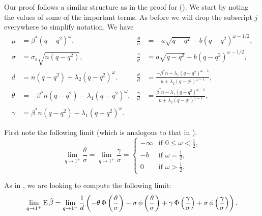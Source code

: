 Our proof follows a similar structure as in the proof for 
(). We start by noting the values of some of the
important terms. As before we will drop the subscript \(j\) everywhere to simplify
notation. We have
\begin{align*}
  \mu    & = \beta^*(q -q^2)^\omega,                     & \frac{\theta}{\sigma} & = -a\sqrt{q-q^2} - b(q-q^2)^{\omega - 1/2},                                           \\
  \sigma & = \sigma_\varepsilon \sqrt{n(q-q^2)},         & \frac{\gamma}{\sigma} & = a\sqrt{q-q^2} - b(q-q^2)^{\omega - 1/2},                                            \\
  d      & = n(q-q^2) + \lambda_2(q-q^2)^\omega.\,       & \frac{\theta}{d}      & = \frac{-\beta^*n - \lambda_1(q-q^2)^{\omega - 1}}{n + \lambda_2(q-q^2)^{\omega -1}}, \\
  \theta & = -\beta^*n(q-q^2) - \lambda_1(q-q^2)^\omega, & \frac{\gamma}{d}      & = \frac{\beta^*n - \lambda_1(q-q^2)^{\omega - 1}}{n + \lambda_2(q-q^2)^{\omega -1}},  \\
  \gamma & = \beta^*n(q-q^2) - \lambda_1(q-q^2)^\omega.
\end{align*}

First note the following limit (which is analogous to that in ).
\begin{equation}
  \label{eq:eval-sigma-limits-weighted}
  \lim_{q \rightarrow 1^+} \frac{\theta}{\sigma} = \lim_{q \rightarrow 1^+} \frac{\gamma}{\sigma} =
  \begin{cases}
    -\infty & \text{if } 0 \leq \omega < \frac{1}{2}, \\
    -b      & \text{if } \omega = \frac{1}{2},        \\
    0       & \text{if } \omega > \frac{1}{2}.
  \end{cases}
\end{equation}

As in , we are looking to compute the following limit:
\begin{equation}
  \label{eq:eval-qlimit-weighted}
  \lim_{q \rightarrow 1^+} \operatorname{E} \hat{\beta} =\lim_{q \rightarrow 1^+}\frac{1}{d}\left(-\theta \operatorname{\Phi}\left(\frac{\theta}{\sigma}\right) - \sigma \operatorname{\phi}\left(\frac{\theta}{\sigma}\right) + \gamma \operatorname{\Phi}\left(\frac{\gamma}{\sigma}\right) + \sigma \operatorname{\phi}\left(\frac{\gamma}{\sigma}\right)\right).
\end{equation}

